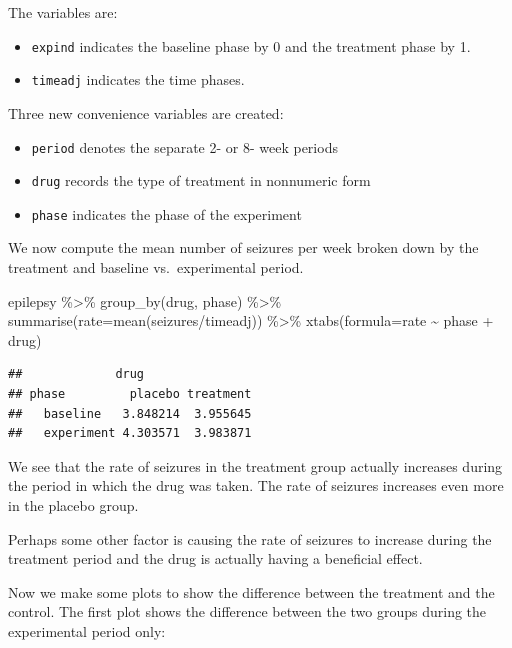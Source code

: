 \documentclass[
  ignorenonframetext,
]{beamer}
\newenvironment{Shaded}{\begin{snugshade}}{\end{snugshade}}
\newcommand{\AttributeTok}[1]{\textcolor[rgb]{0.77,0.63,0.00}{#1}}
\newcommand{\FunctionTok}[1]{\textcolor[rgb]{0.00,0.00,0.00}{#1}}
\newcommand{\NormalTok}[1]{#1}
\newcommand{\SpecialCharTok}[1]{\textcolor[rgb]{0.00,0.00,0.00}{#1}}
\providecommand{\tightlist}{%
  \setlength{\itemsep}{0pt}\setlength{\parskip}{0pt}}
\begin{document}
\begin{frame}[fragile]{}
\protect\hypertarget{section-2}{}
The variables are:

\begin{itemize}
\tightlist
\item
  \texttt{expind} indicates the baseline phase by 0 and the treatment
  phase by 1.\\
\item
  \texttt{timeadj} indicates the time phases.
\end{itemize}

Three new convenience variables are created:

\begin{itemize}
\tightlist
\item
  \texttt{period} denotes the separate 2- or 8- week periods
\item
  \texttt{drug} records the type of treatment in nonnumeric form
\item
  \texttt{phase} indicates the phase of the experiment
\end{itemize}

We now compute the mean number of seizures per week broken down by the
treatment and baseline vs.~experimental period.

\vspace{12pt}
\tiny

\begin{Shaded}
\begin{Highlighting}[]
\NormalTok{epilepsy }\SpecialCharTok{\%\textgreater{}\%} 
  \FunctionTok{group\_by}\NormalTok{(drug, phase) }\SpecialCharTok{\%\textgreater{}\%} 
  \FunctionTok{summarise}\NormalTok{(}\AttributeTok{rate=}\FunctionTok{mean}\NormalTok{(seizures}\SpecialCharTok{/}\NormalTok{timeadj)) }\SpecialCharTok{\%\textgreater{}\%}
\FunctionTok{xtabs}\NormalTok{(}\AttributeTok{formula=}\NormalTok{rate }\SpecialCharTok{\textasciitilde{}}\NormalTok{ phase }\SpecialCharTok{+}\NormalTok{ drug)}
\end{Highlighting}
\end{Shaded}

\begin{verbatim}
##             drug
## phase         placebo treatment
##   baseline   3.848214  3.955645
##   experiment 4.303571  3.983871
\end{verbatim}
\end{frame}

\begin{frame}{}
\protect\hypertarget{section-3}{}
We see that the rate of seizures in the treatment group actually
increases during the period in which the drug was taken. The rate of
seizures increases even more in the placebo group.

Perhaps some other factor is causing the rate of seizures to increase
during the treatment period and the drug is actually having a beneficial
effect.

Now we make some plots to show the difference between the treatment and
the control. The first plot shows the difference between the two groups
during the experimental period only:
\end{frame}
\end{document}
